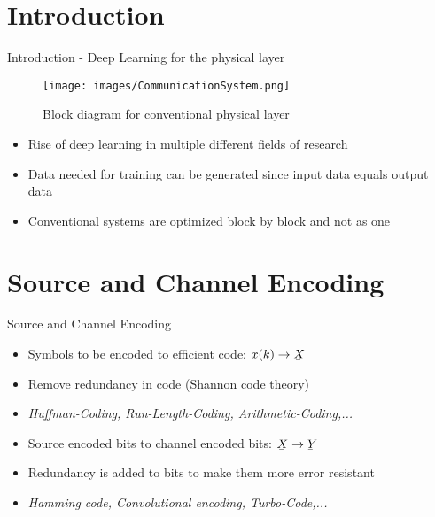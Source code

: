 \documentclass[xcolor=table,mathserif,9pt]{beamer}    %
\newcommand{\ubar}[1]{\underaccent{\bar}{#1}}
\begin{document}
\section{Introduction}%
\label{sec:introduction}
\begin{frame}{Introduction - Deep Learning for the physical layer}

\begin{figure}[htpb]
	\centering
	\texttt{[image: images/CommunicationSystem.png]}
	\caption{Block diagram for conventional physical layer \cite{CommTech}}
\end{figure}

\vspace{1em}
\begin{itemize}
	\item Rise of deep learning in multiple different fields of research
	\item Data needed for training can be generated since input data equals output data
	\item Conventional systems are optimized block by block and not as one
\end{itemize}


\end{frame}

\section{Source and Channel Encoding}%
\begin{frame}{Source and Channel Encoding}

\vspace{1em}
\begin{itemize}
	\item Symbols to be encoded to efficient code: $x(k) \to \ubar{X}$
	\item Remove redundancy in code (Shannon code theory)
	\item \emph{Huffman-Coding, Run-Length-Coding, Arithmetic-Coding,...}
\end{itemize}

\vspace{2em}

\vspace{1em}
\begin{itemize}
	\item Source encoded bits to channel encoded bits: $\ubar{X} \to \ubar{Y}$
	\item Redundancy is added to bits to make them more error resistant
	\item \emph{Hamming code, Convolutional encoding, Turbo-Code,...}
\end{itemize}

\end{frame}
\end{document}
